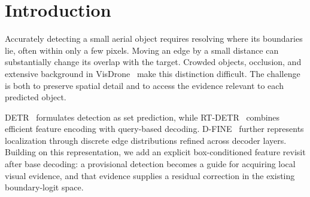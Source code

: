 \begin{abstract}
Precise localization of small aerial objects requires spatial evidence that distinguishes nearby boundary positions. We present a box-conditioned visual refinement framework built on RT-DETR and D-FINE's boundary representation. A local expert revisits three feature levels around predicted boxes and produces residual class and edge logits. Its directly supervised distributions also provide localization targets. Transfer checks matched-object identity, boundary support, and edge quality, followed by the IoU of the actual mixture of selected expert edges and retained student edges. A fixed reference frame keeps these distributions geometrically comparable, while shared P3 refinement supplies both prediction paths. On converted-label VisDrone, the complete detector exceeds D-FINE-L by 1.579 AP and 1.237 small-object AP at the final checkpoint under a common evaluator with different training recipes. It improves native test AP over stock RT-DETR-L by 5.861 points. A matched validation pair supports a 0.832-point gain from shared P3 refinement within the expert-equipped configuration. Fixed-input throughput is 74.129 images/s on RTX 4090 at $640\times640$, FP32, and batch eight.
\end{abstract}
\par
{}

\section{Introduction}
Accurately detecting a small aerial object requires resolving where its boundaries lie, often within only a few pixels. Moving an edge by a small distance can substantially change its overlap with the target. Crowded objects, occlusion, and extensive background in VisDrone~\cite{zhu2018visdrone} make this distinction difficult. The challenge is both to preserve spatial detail and to access the evidence relevant to each predicted object.

DETR~\cite{carion2020detr} formulates detection as set prediction, while RT-DETR~\cite{zhao2024rtdetr} combines efficient feature encoding with query-based decoding. D-FINE~\cite{peng2025dfine} further represents localization through discrete edge distributions refined across decoder layers. Building on this representation, we add an explicit box-conditioned feature revisit after base decoding: a provisional detection becomes a guide for acquiring local visual evidence, and that evidence supplies a residual correction in the existing boundary-logit space.

